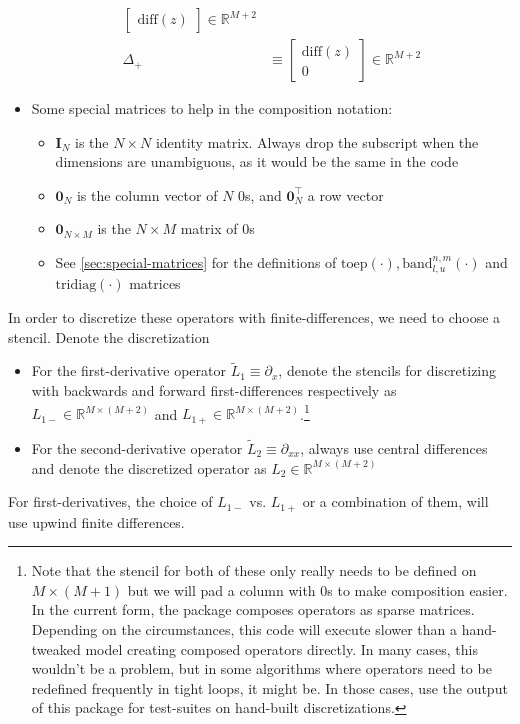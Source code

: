 \documentclass[11pt]{article}
\newcommand{\R}{\ensuremath{\mathbb{R}}}
\newcommand{\band}{\ensuremath{\mathrm{band}}}
\newcommand{\toep}{\ensuremath{\mathrm{toep}}}
\newcommand{\tridiag}{\ensuremath{\mathrm{tridiag}}}
\newcommand{\D}[1][]{\ensuremath{\partial_{#1}}}
\theoremstyle{definition}
\begin{document}
\begin{itemize}
\begin{align}
\begin{bmatrix}
	\text{diff}(z)
	\end{bmatrix}\in\R^{M+2}\label{eq:Delta-minus}\\
	\Delta_{+} &\equiv \begin{bmatrix} \text{diff}(z)\\
	0
	\end{bmatrix}\in\R^{M+2}
	\end{align}
	\item Some special matrices to help in the composition notation:
	\begin{itemize}
		\item $\mathbf{I}_N$ is the $N\times N$ identity matrix.  Always drop the subscript when the dimensions are unambiguous, as it would be the same in the code
		\item $\mathbf{0}_N$ is the column vector of $N$ $0$s, and $\mathbf{0}_N^{\top}$ a row vector
		\item $\mathbf{0}_{N\times M}$ is the $N\times M$ matrix of $0$s
		\item See \cref{sec:special-matrices} for the definitions of $\toep(\cdot), \band^{n,m}_{l,u}(\cdot)$ and $\tridiag(\cdot)$ matrices
	\end{itemize}
\end{itemize}

In order to discretize these operators with finite-differences, we need to choose a stencil.  Denote the discretization
\begin{itemize}
	\item For the first-derivative operator $\tilde{L}_1 \equiv \D[x]$, denote the stencils for discretizing with backwards and forward first-differences respectively as $L_{1-}\in \R^{M\times(M+2)}$ and $L_{1+}\in \R^{M\times(M+2)}$.\footnote{Note that the stencil for both of these only really needs to be defined on $M \times (M+1)$ but we will pad a column with $0$s to make composition easier. In the current form, the package composes operators as sparse matrices.  Depending on the circumstances, this code will execute slower than a hand-tweaked model creating composed operators directly.  In many cases, this wouldn't be a problem, but in some algorithms where operators need to be redefined frequently in tight loops, it might be.  In those cases, use the output of this package for test-suites on hand-built discretizations.}
	\item For the second-derivative operator $\tilde{L}_2 \equiv \D[x x]$, always use central differences and denote the discretized operator as $L_2 \in \R^{M\times(M+2)}$
\end{itemize}
For first-derivatives, the choice of $L_{1-}$ vs. $L_{1+}$ or a combination of them, will use upwind finite differences.
\end{document}
